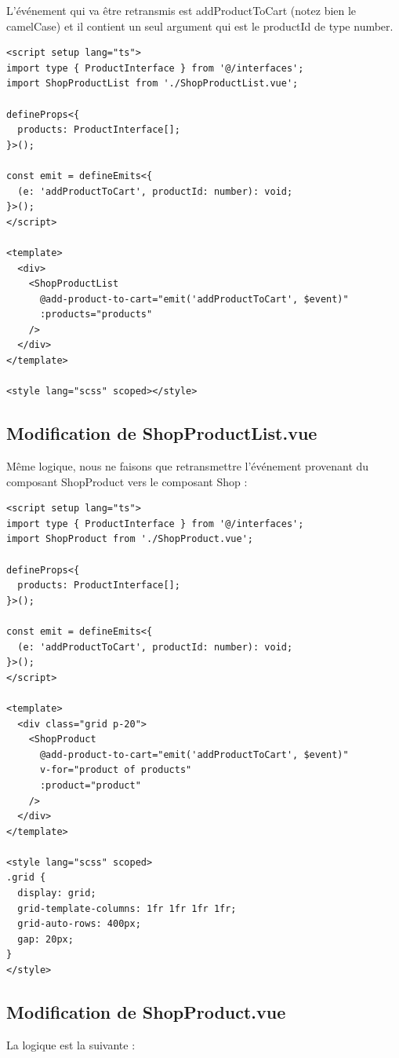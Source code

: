 \documentclass{article}
\begin{document}
L'événement qui va être retransmis est {\color{monOrange}addProductToCart} (notez bien le {\color{monOrange}camelCase}) et il contient un seul argument qui est le {\color{monOrange}productId} de type {\color{monOrange}number}.
\begin{verbatim}
<script setup lang="ts">
import type { ProductInterface } from '@/interfaces';
import ShopProductList from './ShopProductList.vue';

defineProps<{
  products: ProductInterface[];
}>();

const emit = defineEmits<{
  (e: 'addProductToCart', productId: number): void;
}>();
</script>

<template>
  <div>
    <ShopProductList
      @add-product-to-cart="emit('addProductToCart', $event)"
      :products="products"
    />
  </div>
</template>

<style lang="scss" scoped></style>
\end{verbatim}
\subsection{Modification de {\color{monOrange}ShopProductList.vue}}
Même logique, nous ne faisons que retransmettre l'événement provenant du composant {\color{monOrange}ShopProduct} vers le composant {\color{monOrange}Shop} :
\begin{verbatim}
<script setup lang="ts">
import type { ProductInterface } from '@/interfaces';
import ShopProduct from './ShopProduct.vue';

defineProps<{
  products: ProductInterface[];
}>();

const emit = defineEmits<{
  (e: 'addProductToCart', productId: number): void;
}>();
</script>

<template>
  <div class="grid p-20">
    <ShopProduct
      @add-product-to-cart="emit('addProductToCart', $event)"
      v-for="product of products"
      :product="product"
    />
  </div>
</template>

<style lang="scss" scoped>
.grid {
  display: grid;
  grid-template-columns: 1fr 1fr 1fr 1fr;
  grid-auto-rows: 400px;
  gap: 20px;
}
</style>
\end{verbatim}
\subsection{Modification de {\color{monOrange}ShopProduct.vue}}
La logique est la suivante :
\end{document}
